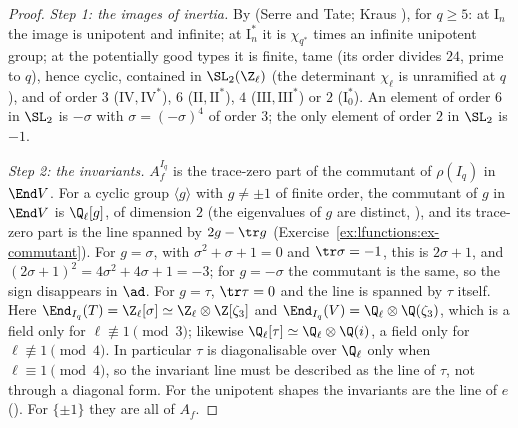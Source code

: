 \begin{proof}
\emph{Step 1: the images of inertia.} By  (Serre and Tate; Kraus \cite{Kraus90}), for $q\ge5$: at $\mathrm I_n$ the image is unipotent and infinite; at $\mathrm I_n^*$ it is
$\chi_{q^*}$ times an infinite unipotent group; at the potentially good types it is finite, tame (its order divides $24$, prime to $q$), hence cyclic, contained in $\SL_2(\Z_\ell)$
(the determinant $\chi_\ell$ is unramified at $q$), and of order $3$ ($\mathrm{IV},\mathrm{IV}^*$), $6$ ($\mathrm{II},\mathrm{II}^*$), $4$ ($\mathrm{III},\mathrm{III}^*$) or $2$ ($\mathrm I_0^*$). An element of order
$6$ in $\SL_2$ is $-\sigma$ with $\sigma=(-\sigma)^4$ of order $3$; the only element of order $2$ in $\SL_2$ is $-1$.

\emph{Step 2: the invariants.} $A_f^{I_q}$ is the trace-zero part of the commutant of $\rho(I_q)$ in $\End V$. For a cyclic group $\langle g\rangle$ with $g\ne\pm1$ of finite order, the
commutant of $g$ in $\End V$ is $\Q_\ell[g]$, of dimension $2$ (the eigenvalues of $g$ are distinct, ), and its trace-zero part is the line spanned by
$2g-\tr g$ (Exercise~\ref{ex:lfunctions:ex-commutant}). For $g=\sigma$, with $\sigma^2+\sigma+1=0$ and $\tr\sigma=-1$, this is $2\sigma+1$, and $(2\sigma+1)^2=4\sigma^2+4\sigma+1=-3$; for $g=-\sigma$
the commutant is the same, so the sign disappears in $\ad$. For $g=\tau$, $\tr\tau=0$ and the line is spanned by $\tau$ itself. Here
$\End_{I_q}(T)=\Z_\ell[\sigma]\simeq\Z_\ell\otimes\Z[\zeta_3]$ and $\End_{I_q}(V)=\Q_\ell\otimes\Q(\zeta_3)$, which is a field only for $\ell\not\equiv1\pmod3$; likewise
$\Q_\ell[\tau]\simeq\Q_\ell\otimes\Q(i)$, a field only for $\ell\not\equiv1\pmod4$. In particular $\tau$ is diagonalisable over $\Q_\ell$ only when $\ell\equiv1\pmod4$, so the
invariant line must be described as the line of $\tau$, not through a diagonal form. For the unipotent shapes the invariants are the line of $e$
(). For $\{\pm1\}$ they are all of $A_f$.


\end{proof}
